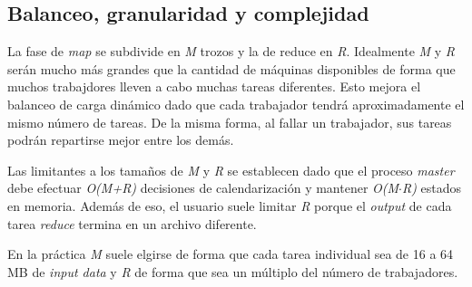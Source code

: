 \documentclass[spanish]{article}
\begin{document}
\subsection{Balanceo, granularidad y complejidad}
	La fase de \textit{map} se subdivide en \textit{M} trozos y la de reduce en \textit{R}. Idealmente \textit{M} y \textit{R} serán mucho más grandes que la cantidad de máquinas disponibles de forma que muchos trabajdores lleven a cabo muchas tareas diferentes. Esto mejora el balanceo de carga dinámico dado que cada trabajador tendrá aproximadamente el mismo número de tareas. De la misma forma, al fallar un trabajador, sus tareas podrán repartirse mejor entre los demás. 
	
	Las limitantes a los tamaños de \textit{M} y \textit{R} se establecen dado que el proceso \textit{master} debe efectuar \textit{O(M+R)} decisiones de calendarización y mantener \textit{O(M$\cdot$R)} estados en memoria. Adem\'{a}s de eso, el usuario suele limitar \textit{R} porque el \textit{output} de cada tarea \textit{reduce} termina en un archivo diferente. 
	
	En la pr\'{a}ctica \textit{M} suele elgirse de forma que cada tarea individual sea de 16 a 64 MB de \textit{input data} y \textit{R} de forma que sea un m\'{u}ltiplo del n\'{u}mero de trabajadores. 
\end{document}
